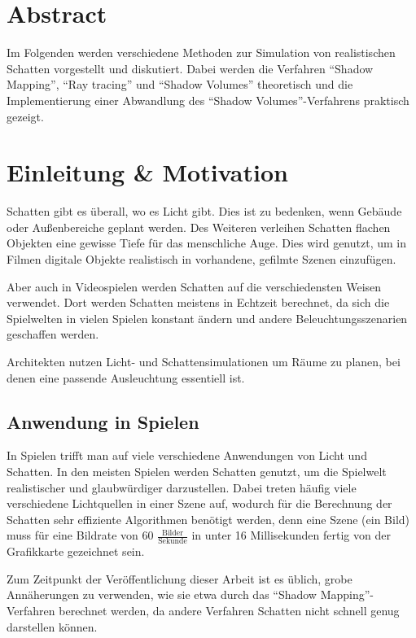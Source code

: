 \section{Abstract}

Im Folgenden werden verschiedene Methoden zur Simulation von realistischen Schatten
vorgestellt und diskutiert. Dabei werden die Verfahren "`Shadow Mapping"',
"`Ray tracing"' und "`Shadow Volumes"' theoretisch und die Implementierung
einer Abwandlung des "`Shadow Volumes"'-Verfahrens praktisch gezeigt.


\section{Einleitung \& Motivation}

Schatten gibt es überall, wo es Licht gibt. Dies ist zu bedenken, wenn
Gebäude oder Außenbereiche geplant werden.
Des Weiteren verleihen Schatten flachen Objekten eine gewisse Tiefe für das menschliche Auge.
Dies wird genutzt, um in Filmen digitale Objekte realistisch in vorhandene, gefilmte Szenen einzufügen.

Aber auch in Videospielen werden Schatten auf die verschiedensten Weisen verwendet. Dort werden
Schatten meistens in Echtzeit berechnet, da sich die Spielwelten in vielen Spielen konstant ändern und andere Beleuchtungsszenarien geschaffen werden.

Architekten nutzen Licht- und Schattensimulationen um Räume zu planen, bei denen eine passende
Ausleuchtung essentiell ist.

\subsection*{Anwendung in Spielen}

In Spielen trifft man auf viele verschiedene Anwendungen von Licht und Schatten. In den meisten
Spielen werden Schatten genutzt, um die Spielwelt realistischer und glaubwürdiger darzustellen.
Dabei treten häufig viele verschiedene Lichtquellen in einer Szene auf, wodurch für die Berechnung der
Schatten sehr effiziente Algorithmen benötigt werden, denn eine Szene (ein Bild) muss für eine Bildrate
von 60 $\frac{\text{Bilder}}{\text{Sekunde}}$ in unter 16 Millisekunden fertig von der Grafikkarte gezeichnet sein.

Zum Zeitpunkt der Veröffentlichung dieser Arbeit ist es üblich, grobe Annäherungen zu verwenden,
wie sie etwa durch das "`Shadow Mapping"'-Verfahren berechnet werden, da andere Verfahren Schatten nicht schnell genug darstellen können.

